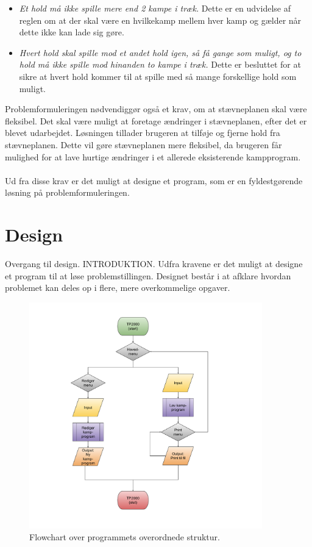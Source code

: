 \begin{itemize}
    \item \textit{Et hold må ikke spille mere end 2 kampe i træk.} Dette er en udvidelse af reglen om at der skal være en hvilkekamp mellem hver kamp og gælder når dette ikke kan lade sig gøre. 
    \item \textit{Hvert hold skal spille mod et andet hold igen, så få gange som muligt, og to hold må ikke spille mod hinanden to kampe i træk.} Dette er besluttet for at sikre at hvert hold kommer til at spille med så mange forskellige hold som muligt.
\end{itemize}

Problemformuleringen nødvendiggør også et krav, om at stævneplanen skal være fleksibel. Det skal være muligt at foretage ændringer i stævneplanen, efter det er blevet udarbejdet. Løsningen tillader brugeren at tilføje og fjerne hold fra stævneplanen. Dette vil gøre stævneplanen mere fleksibel, da brugeren får mulighed for at lave hurtige ændringer i et allerede eksisterende kampprogram.
\\\\
Ud fra disse krav er det muligt at designe et program, som er en fyldestgørende løsning på problemformuleringen.

\section{Design}
Overgang til design. INTRODUKTION.
Udfra kravene er det muligt at designe et program til at løse problemstillingen. Designet består i at afklare hvordan problemet kan deles op i flere, mere overkommelige opgaver. 

\begin{figure}[H]
  \centering
  \includegraphics[width=0.9\textwidth]{figures/Overordnet.pdf}
  \caption{Flowchart over programmets overordnede struktur.}
  \label{fig:overordnet-flowchart}
\end{figure}

